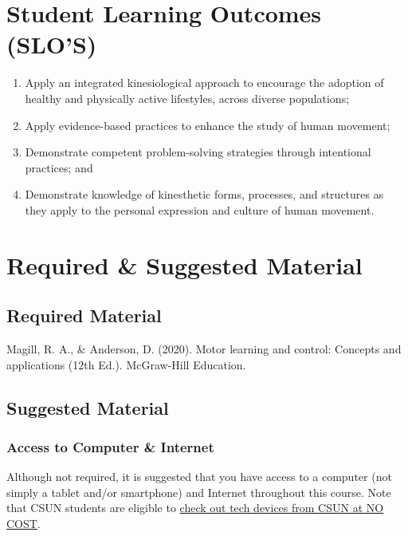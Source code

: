 \documentclass[11pt,]{article}
\providecommand{\tightlist}{%
  \setlength{\itemsep}{0pt}\setlength{\parskip}{0pt}}
\begin{document}
\hypertarget{student-learning-outcomes-slos}{%
\section{Student Learning Outcomes
(SLO'S)}\label{student-learning-outcomes-slos}}

\begin{enumerate}
\def\labelenumi{\arabic{enumi}.}
\tightlist
\item
  Apply an integrated kinesiological approach to encourage the adoption
  of healthy and physically active lifestyles, across diverse
  populations;
\item
  Apply evidence-based practices to enhance the study of human movement;
\item
  Demonstrate competent problem-solving strategies through intentional
  practices; and
\item
  Demonstrate knowledge of kinesthetic forms, processes, and structures
  as they apply to the personal expression and culture of human
  movement.
\end{enumerate}

\hypertarget{required-suggested-material}{%
\section{Required \& Suggested
Material}\label{required-suggested-material}}

\hypertarget{required-material}{%
\subsection{Required Material}\label{required-material}}

Magill, R. A., \& Anderson, D. (2020). Motor learning and control:
Concepts and applications (12th Ed.). McGraw-Hill Education.

\hypertarget{suggested-material}{%
\subsection{Suggested Material}\label{suggested-material}}

\hypertarget{access-to-computer-internet}{%
\subsubsection{Access to Computer \&
Internet}\label{access-to-computer-internet}}

Although not required, it is suggested that you have access to a
computer (not simply a tablet and/or smartphone) and Internet throughout
this course. Note that CSUN students are eligible to
\href{https://www.csun.edu/it/device-loaner-program}{check out tech
devices from CSUN at NO COST}.
\end{document}
